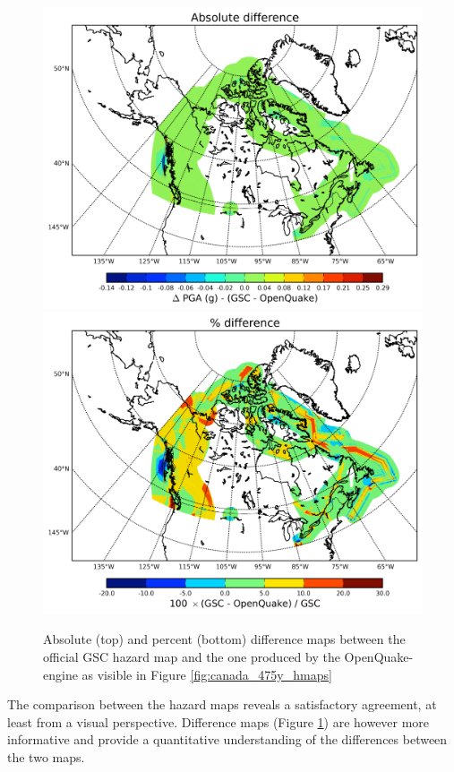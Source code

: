 \begin{figure}
\centering
\includegraphics[width=14cm]{./qareport/pictures/GSC_OQ_PGA_0pt1_abs_diff.pdf}
\includegraphics[width=14cm]{./qareport/pictures/GSC_OQ_PGA_0pt1_percent_diff.pdf}
\caption{Absolute (top) and percent (bottom) difference maps between the official GSC hazard map and the one produced by the OpenQuake-engine as visible in Figure \ref{fig:canada_475y_hmaps}}
\label{fig:canada_475y_dmaps}
\end{figure}
The comparison between the hazard maps reveals a satisfactory agreement, at
least from a visual perspective. Difference maps (Figure
\ref{fig:canada_475y_dmaps}) are however more informative and provide a
quantitative understanding of the differences between the two maps.

